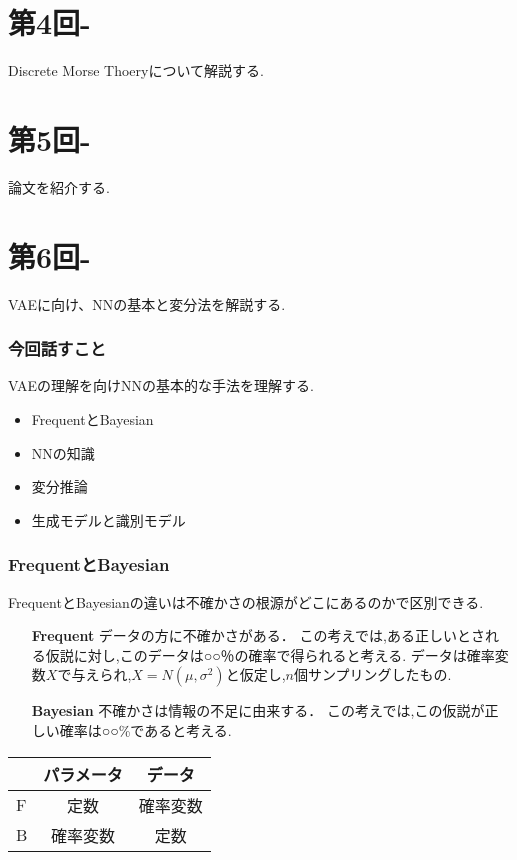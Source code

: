 \documentclass{ujarticle}
\begin{document}
\part{第4回-}
Discrete Morse Thoeryについて解説する.

\part{第5回-}
論文を紹介する.

\part{第6回-}
VAEに向け、NNの基本と変分法を解説する.

\section{今回話すこと}
\label{sec:今回話すこと}
VAEの理解を向けNNの基本的な手法を理解する.
\begin{itemize}
  \item FrequentとBayesian
  \item NNの知識
  \item 変分推論
  \item 生成モデルと識別モデル
\end{itemize}
\section{FrequentとBayesian}
\label{sec:FrequentとBayesian}
FrequentとBayesianの違いは不確かさの根源がどこにあるのかで区別できる.
\begin{itemize}
  \item[\textbf{Frequent}] データの方に不確かさがある．
この考えでは,ある正しいとされる仮説に対し,このデータは○○％の確率で得られると考える.
データは確率変数$X$で与えられ,$X=N(μ,σ^2)$と仮定し,$n$個サンプリングしたもの.
  \item[\textbf{Bayesian}] 不確かさは情報の不足に由来する．
この考えでは,この仮説が正しい確率は○○\%であると考える.
\end{itemize}

\begin{table}[htb]
  \centering
  \begin{tabular}{l|cc}
     & パラメータ & データ   \\ \hline
     F & 定数 & 確率変数 \\
    B& 確率変数 & 定数 \\
  \end{tabular}
\end{table}
\end{document}
